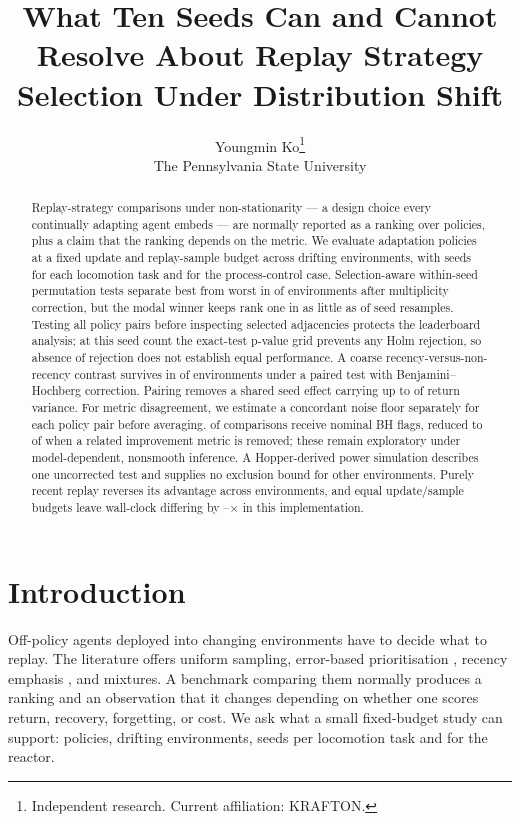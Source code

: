 \documentclass{article}
\title{What Ten Seeds Can and Cannot Resolve
About Replay Strategy Selection Under Distribution Shift}
\author{Youngmin Ko\thanks{Independent research. Current affiliation: KRAFTON.}\\
The Pennsylvania State University}
\date{}
\begin{document}
\maketitle

\begin{abstract}
Replay-strategy comparisons under non-stationarity --- a design choice every
continually adapting agent embeds --- are normally reported as a ranking over
policies, plus a claim that the ranking depends on the metric. We evaluate
\NPolHopper{} adaptation policies at a fixed update and replay-sample budget
across \NEnv{} drifting environments, with \SeedsHopper{} seeds for each
locomotion task and \SeedsPcgym{} for the process-control case. Selection-aware
within-seed permutation tests separate best from worst in \ExtremesBH{} of
\NEnv{} environments after multiplicity correction, but the modal winner
keeps rank one in as little as \TopOneProbMin{} of seed resamples. Testing all
policy pairs before inspecting selected adjacencies protects the leaderboard
analysis; at this seed count the exact-test p-value grid prevents any Holm
rejection, so absence of rejection does not establish equal performance. A
coarse recency-versus-non-recency contrast survives in \ContrastBH{} of
\ContrastNTests{} environments under a paired test with Benjamini--Hochberg
correction. Pairing removes a shared seed effect carrying up to \IccMax{} of
return variance. For metric disagreement, we estimate a concordant noise floor
separately for each policy pair before averaging. \NBH{} of \NTests{}
comparisons receive nominal BH flags, reduced to \NBHDrop{} of \NDistinct{}
when a related improvement metric is removed; these remain exploratory under
model-dependent, nonsmooth inference. A Hopper-derived power simulation
describes one uncorrected test and supplies no exclusion bound for other
environments. Purely recent replay reverses its advantage across environments,
and equal update/sample budgets leave wall-clock differing by
\WallSpreadMin--\WallSpreadMax$\times$ in this implementation.
\end{abstract}

\section{Introduction}

Off-policy agents deployed into changing environments have to decide what to
replay. The literature offers uniform sampling, error-based prioritisation
\citep{schaul2016per}, recency emphasis \citep{wang2019ere}, and mixtures. A
benchmark comparing them normally produces a ranking and an observation that
it changes depending on whether one scores return, recovery, forgetting, or
cost. We ask what a small fixed-budget study can support: \NPolHopper{}
policies, \NEnv{} drifting environments, \SeedsHopper{} seeds per locomotion
task and \SeedsPcgym{} for the reactor.
\end{document}
